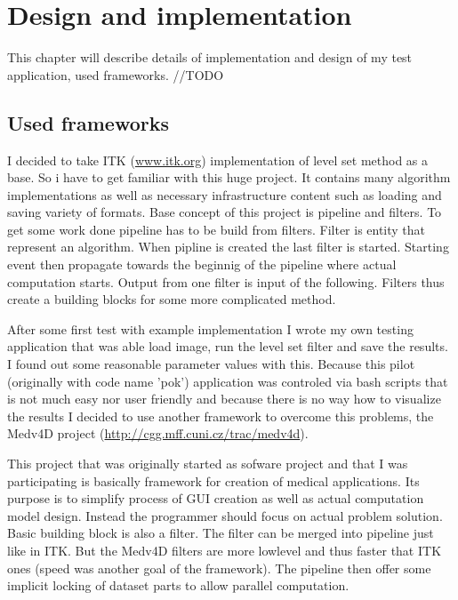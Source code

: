 \chapter{Design and implementation}

This chapter will describe details of implementation and design of my test application, used frameworks. //TODO

\section{Used frameworks}

\par
I decided to take ITK (\url{www.itk.org}) implementation of level set method as a base. So i have to get familiar with this huge project. It contains many algorithm implementations as well as necessary infrastructure content such as loading and saving variety of formats. Base concept of this project is pipeline and filters. To get some work done pipeline has to be build from filters. Filter is entity that represent an algorithm. When pipline is created the last filter is started. Starting event then propagate towards the beginnig of the pipeline where actual computation starts. Output from one filter is input of the following. Filters thus create a building blocks for some more complicated method.

\par
After some first test with example implementation I wrote my own testing application that was able load image, run the level set filter and save the results. I found out some reasonable parameter values with this. Because this pilot (originally with code name 'pok') application was controled via bash scripts that is not much easy nor user friendly and because there is no way how to visualize the results I decided to use another framework to overcome this problems, the Medv4D project (\url{http://cgg.mff.cuni.cz/trac/medv4d}).

\par
This project that was originally started as sofware project and that I was participating is basically framework for creation of medical applications. Its purpose is to simplify process of GUI creation as well as actual computation model design. Instead the programmer should focus on actual problem solution. Basic building block is also a filter. The filter can be merged into pipeline just like in ITK. But the Medv4D filters are more lowlevel and thus faster that ITK ones (speed was another goal of the framework). The pipeline then offer some implicit locking of dataset parts to allow parallel computation.

